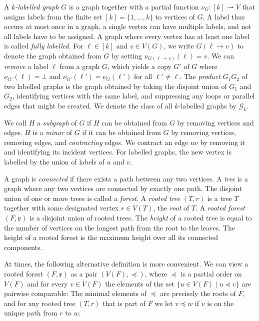 \documentclass[a4paper,UKenglish,cleveref, autoref, thm-restate]{lipics-v2021}
\newcommand{\CG}{\ensuremath{\mathcal G}}
\newcommand{\parto}{\ensuremath{\rightharpoonup}}
\newcommand{\tup}[1]{\ensuremath{\boldsymbol{#1}}}
\begin{document}
A \emph{$k$-labelled graph} $G$ is a graph together with a partial function $\nu_G \colon [k] \parto V$ that assigns labels from the finite set $[k] = \{1, \dots, k\}$ to vertices of $G$. A label thus occurs at most once in a graph, a single vertex can have multiple labels, and not all labels have to be assigned. A graph where every vertex has at least one label is called \emph{fully labelled}.
For $\ell \in [k]$ and $v \in V(G)$, we write $G(\ell \to v)$ to denote the graph obtained from $G$ by setting $\nu_{G(\ell \to v)}(\ell) = v$. We can \emph{remove} a label $\ell$ from a graph $G$, which yields a copy $G'$ of $G$ where $\nu_{G'}(\ell) = \bot$ and $\nu_{G'}(\ell') = \nu_{G}(\ell')$ for all $\ell' \neq \ell$. The \emph{product} $G_1G_2$ of two labelled graphs is the graph obtained by taking the disjoint union of $G_1$ and $G_2$, identifying vertices with the same label, and suppressing any loops or parallel edges that might be created.
We denote the class of all $k$-labelled graphs by $\CG_k$.

We call $H$ a \emph{subgraph} of $G$ if $H$ can be obtained from $G$ by removing vertices and edges. $H$ is a \emph{minor} of $G$ if it can be obtained from $G$ by removing vertices, removing edges, and \emph{contracting} edges. We contract an edge $uv$ by removing it and identifying its incident vertices. For labelled graphs, the new vertex is labelled by the union of labels of $u$ and $v$.

A graph is \emph{connected} if there exists a path between any two vertices. A \emph{tree} is a graph where any two vertices are connected by exactly one path. The disjoint union of one or more trees is called a \emph{forest}. A \emph{rooted tree} $(T, r)$ is a tree $T$ together with some designated vertex $r \in V(T)$, the \emph{root} of $T$. A \emph{rooted forest} $(F, \tup{r})$ is a disjoint union of rooted trees. The \emph{height} of a rooted tree is equal to the number of vertices on the longest path from the root to the leaves. The height of a rooted forest is the maximum height over all its connected components.

At times, the following alternative definition is more convenient. We can view a rooted forest $(F, \tup{r})$ as a pair $(V(F), \preceq)$, where $\preceq$ is a partial order on $V(F)$ and for every $v \in V(F)$ the elements of the set $\{u \in V(F) \mid u \preceq v\}$ are pairwise comparable: The minimal elements of $\preceq$ are precisely the roots of $F$, and for any rooted tree $(T, r)$ that is part of $F$ we let $v \preceq w$ if $v$ is on the unique path from $r$ to $w$.
\end{document}
